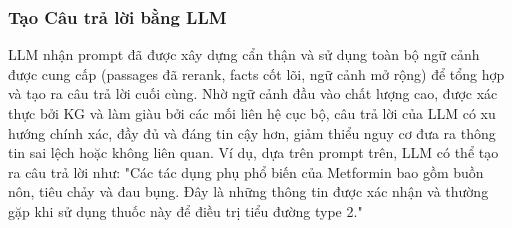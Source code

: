 \documentclass[../main.tex]{subfiles}
\begin{document}
\subsubsection{Tạo Câu trả lời bằng LLM}

LLM nhận prompt đã được xây dựng cẩn thận và sử dụng toàn bộ ngữ cảnh được cung cấp (passages đã rerank, facts cốt lõi, ngữ cảnh mở rộng) để tổng hợp và tạo ra câu trả lời cuối cùng. Nhờ ngữ cảnh đầu vào chất lượng cao, được xác thực bởi KG và làm giàu bởi các mối liên hệ cục bộ, câu trả lời của LLM có xu hướng chính xác, đầy đủ và đáng tin cậy hơn, giảm thiểu nguy cơ đưa ra thông tin sai lệch hoặc không liên quan. Ví dụ, dựa trên prompt trên, LLM có thể tạo ra câu trả lời như: "Các tác dụng phụ phổ biến của Metformin bao gồm buồn nôn, tiêu chảy và đau bụng. Đây là những thông tin được xác nhận và thường gặp khi sử dụng thuốc này để điều trị tiểu đường type 2."
\end{document}
